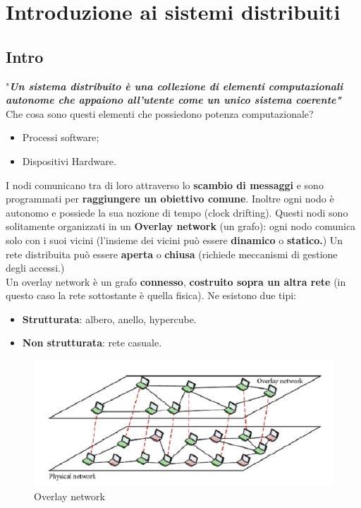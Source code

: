 \documentclass[12pt]{article}
\begin{document}
	\maketitle
	\tableofcontents
	\listoftables
	\listoffigures
\section{Introduzione ai sistemi distribuiti}
	\subsection{Intro}
		"\textit{\textbf{Un sistema distribuito è una collezione di elementi computazionali autonome che appaiono all'utente come un unico sistema coerente"}}
		Che cosa sono questi elementi che possiedono potenza computazionale?
		\begin{itemize}
			\item Processi software;
			\item Dispositivi Hardware.
		\end{itemize}
		I nodi comunicano tra di loro attraverso lo \textbf{scambio di messaggi} e sono programmati per \textbf{raggiungere un obiettivo comune}. Inoltre ogni nodo è autonomo e possiede la sua nozione di tempo (clock drifting). Questi nodi sono solitamente organizzati in un \textbf{Overlay network} (un grafo): ogni nodo comunica solo con i suoi vicini (l'insieme dei vicini può essere \textbf{dinamico} o \textbf{statico.}) Un rete distribuita può essere \textbf{aperta} o \textbf{chiusa} (richiede meccanismi di gestione degli accessi.)\\
		Un overlay network è un grafo \textbf{connesso}, \textbf{costruito sopra un altra rete } (in questo caso la rete sottostante è quella fisica). Ne esistono due tipi:
		\begin{itemize}
			\item \textbf{Strutturata}: albero, anello, hypercube.
			\item \textbf{Non strutturata}: rete casuale.
		\end{itemize}
		\begin{figure}[h!]
			\centering
			\includegraphics[scale=0.50]{img/over.png}
			\caption{Overlay network}
		\end{figure}
\end{document}
